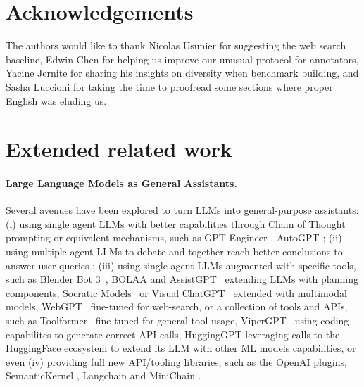 \documentclass{fairmeta}
\begin{document}
\section{Acknowledgements}



The authors would like to thank Nicolas Usunier for suggesting the web search baseline, Edwin Chen for helping us improve our unusual protocol for annotators, Yacine Jernite for sharing his insights on diversity when benchmark building, and Sasha Luccioni for taking the time to proofread some sections where proper English was eluding us.

\vspace{-0.3cm}





\newpage

\appendix


\section{Extended related work}
\label{sec:extended_related_work}

\paragraph{Large Language Models as General Assistants.}
Several avenues have been explored to turn LLMs into general-purpose assistants: (i) using single agent LLMs with better capabilities through Chain of Thought prompting or equivalent mechanisms, such as GPT-Engineer \citep{_osika-2023-gpt}, AutoGPT \citep{_yang-etal-2023-autogpt}; (ii) using multiple agent LLMs to debate and together reach better conclusions to answer user queries \citep{_li-etal-2023-camel,_hong-etal-2023-metagpt,_chan-etal-2023-chateval,_talebirad-nadiri-2023-multiagent}; (iii) using single agent LLMs augmented with specific tools, such as Blender Bot 3~\citep{shuster2022blenderbot}, BOLAA \citep{_liu-etal-2023-bolaa} and AssistGPT~\citep{_gao-etal-2023-assistgpt} extending LLMs with planning components, Socratic Models~\citep{_zeng-etal-2022-socratic} or Visual ChatGPT~\citep{_wu-etal-2023-visual} extended with multimodal models, WebGPT~\citet{nakano2021webgpt} fine-tuned for web-search, or a collection of tools and APIs, such as Toolformer~\citep{schick2023toolformer} fine-tuned for general tool usage, ViperGPT~\citep{_suris-etal-2023-vipergpt} using coding capabilites to generate correct API calls, HuggingGPT \citep{_shen-etal-2023-hugginggpt} leveraging calls to the HuggingFace ecosystem to extend its LLM with other ML models capabilities, or even (iv) providing full new API/tooling libraries, such as the \href{https://openai.com/blog/chatgpt-plugins}{OpenAI plugins}, SemanticKernel \citep{_microsoft-2023-semantic}, Langchain \citep{_chase-2022-langchain} and MiniChain \citep{_rush-2023-minichain}. 
\end{document}
